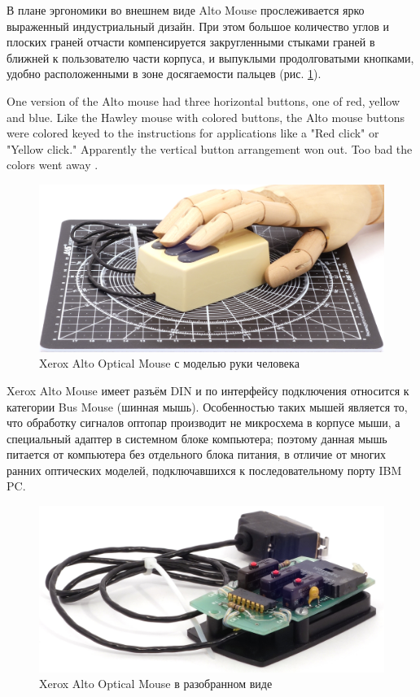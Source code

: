 \documentclass[11pt, a4paper]{article}
\begin{document}
В плане эргономики во внешнем виде Alto Mouse прослеживается ярко выраженный индустриальный дизайн. При этом большое количество углов и плоских граней отчасти компенсируется закругленными стыками граней в ближней к пользователю части корпуса, и выпуклыми продолговатыми кнопками, удобно расположенными в зоне досягаемости пальцев (рис. \ref{fig:NecAltoHand}).

One version of the Alto mouse had three horizontal buttons, one of red, yellow and blue. Like the Hawley mouse with colored buttons, the Alto mouse buttons were colored keyed to the instructions for applications like a "Red click" or "Yellow click." Apparently the vertical button arrangement won out. Too bad the colors went away \cite{mouses}.

\begin{figure}[h]
    \centering
    \includegraphics[scale=0.4]{1981_xerox_alto_mouse/hand_30.jpg}
    \caption{Xerox Alto Optical Mouse с моделью руки человека}
    \label{fig:NecAltoHand}
\end{figure}

Xerox Alto Mouse имеет разъём DIN и по интерфейсу подключения относится к категории Bus Mouse (шинная мышь). Особенностью таких мышей является то, что обработку сигналов оптопар производит не микросхема в корпусе мыши, а специальный адаптер в системном блоке компьютера; поэтому данная мышь питается от компьютера без отдельного блока питания, в отличие от многих ранних оптических моделей, подключавшихся к последовательному порту IBM PC.

\begin{figure}[h]
    \centering
    \includegraphics[scale=0.8]{1981_xerox_alto_mouse/inside_60.jpg}
    \caption{Xerox Alto Optical Mouse в разобранном виде}
    \label{fig:NecAltoInside}
\end{figure}
\end{document}
